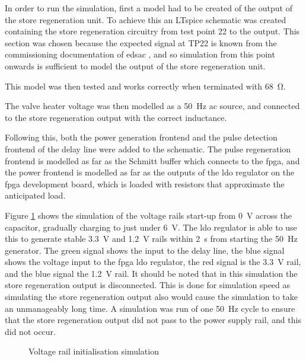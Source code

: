 In order to run the simulation, first a model had to be created of the output of the store regeneration unit. To achieve this an LTspice schematic was created containing the store regeneration circuitry from test point 22 to the output. This section was chosen because the expected signal at TP22 is known from the commissioning documentation of \gls{edsac} \cite[p.7]{linnington2016b}, and so simulation from this point onwards is sufficient to model the output of the store regeneration unit.

This model was then tested and works correctly when terminated with \SI{68}{\ohm}.

The valve heater voltage was then modelled as a \SI{50}{\hertz} \gls{ac} source, and connected to the store regeneration output with the correct inductance.

Following this, both the power generation frontend and the pulse detection frontend of the delay line were added to the schematic. The pulse regeneration frontend is modelled as far as the Schmitt buffer which connects to the \gls{fpga}, and the power frontend is modelled as far as the outputs of the \gls{ldo} regulator on the \gls{fpga} development board, which is loaded with resistors that approximate the anticipated load.

Figure \ref{fig:psu-init} shows the simulation of the voltage rails start-up from \SI{0}{\volt} across the capacitor, gradually charging to just under \SI{6}{\volt}. The \gls{ldo} regulator is able to use this to generate stable \SI{3.3}{\volt} and \SI{1.2}{\volt} rails within \SI{2}{\second} from starting the \SI{50}{\hertz} generator. The green signal shows the input to the delay line, the blue signal shows the voltage input to the \gls{fpga} \gls{ldo} regulator, the red signal is the \SI{3.3}{\volt} rail, and the blue signal the \SI{1.2}{\volt} rail. It should be noted that in this simulation the store regeneration output is disconnected. This is done for simulation speed as simulating the store regeneration output also would cause the simulation to take an unmanageably long time. A simulation was run of one \SI{50}{\hertz} cycle to ensure that the store regeneration output did not pass to the power supply rail, and this did not occur.

\begin{figure}[ht]
	\centering
	\caption{Voltage rail initialisation simulation}
	\label{fig:psu-init}
\end{figure}

